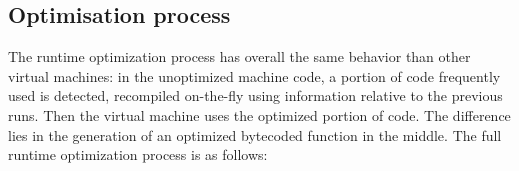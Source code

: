 \documentclass[a4paper,12pt,twoside]{../includes/ThesisStyle}
\begin{document}


\subsection {Optimisation process}

The runtime optimization process has overall the same behavior than other virtual machines: in the unoptimized machine code, a portion of code frequently used is detected, recompiled on-the-fly using information relative to the previous runs. Then the virtual machine uses the optimized portion of code. The difference lies in the generation of an optimized bytecoded function in the middle. The full runtime optimization process is as follows:
\end{document}

